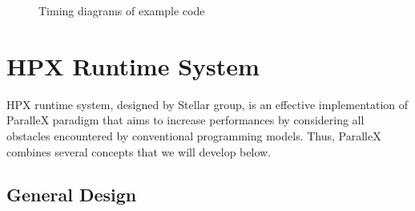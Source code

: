 \documentclass[smallextended]{svjour3}
\begin{document}
% 	      
%       

\begin{figure}[h]
	\centering
	\hspace{0.5cm}
	\caption{Timing diagrams of example code}
	\label{chronofuture}
\end{figure}

\section{HPX Runtime System}\label{HPX}
HPX runtime system, designed by Stellar group, is an effective implementation of ParalleX paradigm that aims to increase performances by considering all obstacles encountered by conventional programming models. Thus, ParalleX combines several concepts that we will develop below.

\subsection{General Design}
\end{document}
